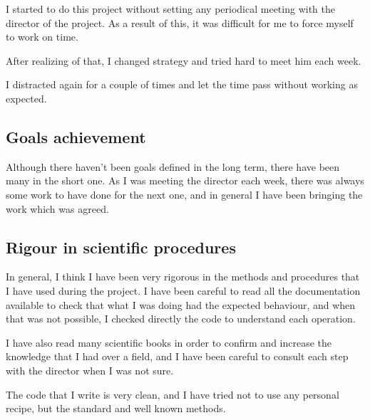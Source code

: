 \documentclass{article}
\begin{document}
    I started to do this project without setting any periodical meeting with
    the director of the project. As a result of this, it was difficult for me to
    force myself to work on time.

    After realizing of that, I changed strategy and tried hard to meet him each
    week.

    I distracted again for a couple of times and let the time pass without
    working as expected.
    \subsection{Goals achievement}
    Although there haven't been goals defined in the long term, there have been
    many in the short one. As I was meeting the director each week, there was
    always some work to have done for the next one, and in general I have been
    bringing the work which was agreed.

    \subsection{Rigour in scientific procedures}
    In general, I think I have been very rigorous in the methods and procedures
    that I have used during the project. I have been careful to read all the
    documentation available to check that what I was doing had the expected
    behaviour, and when that was not possible, I checked directly the code to
    understand each operation.

    I have also read many scientific books in order to confirm and increase the
    knowledge that I had over a field, and I have been careful to consult each
    step with the director when I was not sure.

    The code that I write is very clean, and I have tried not to use any
    personal recipe, but the standard and well known methods.
\end{document}
